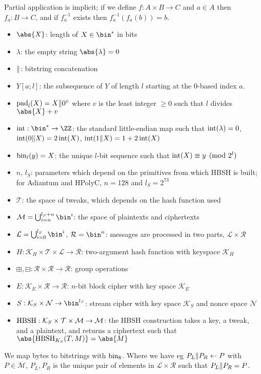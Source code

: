 \documentclass[eprint.tex]{subfiles}
\begin{document}
Partial application is implicit; if we define $f: A \times B \rightarrow C$ and
$a \in A$ then $f_a: B \rightarrow C$, and if $f_a^{-1}$ exists then $f_a^{-1}(f_a(b)) = b$.
\begin{itemize}
    \item $\abs{X}$: length of $X \in \bin^{*}$ in bits
    \item $\lambda$: the empty string $\abs{\lambda} = 0$
    \item $\Vert$: bitstring concatenation
    \item $Y[a;l]$: the subsequence of $Y$ of length $l$ starting at the 0-based index $a$.
    \item $\operatorname{pad}_l(X) = X \Vert 0^v$
    where $v$ is the least integer $\geq 0$ such that $l$ divides $\abs{X} + v$
    \item $\intify: \bin^{*} \rightarrow \ZZ$: the
    standard little-endian map such that
    $\operatorname{int}(\lambda) = 0$, $\operatorname{int}(0 \Vert X) = 2\operatorname{int}(X)$, $\operatorname{int}(1 \Vert X) = 1 + 2\operatorname{int}(X)$
    \item $\operatorname{bin}_l(y) = X$: the unique
    $l$-bit sequence such that $\operatorname{int}(X) \equiv y \pmod{2^l}$
    \item $n$, $l_S$: parameters which depend on the
    primitives from which HBSH is built;
    for Adiantum and HPolyC, $n = 128$ and $l_S = 2^{73}$
    \item $\mathcal{T}$: the
    space of tweaks, which depends on the hash function used
    \item $\mathcal{M} = \bigcup_{i=n}^{l_S + n}\bin^i$: the
    space of plaintexts and ciphertexts
    \item $\mathcal{L} = \bigcup_{i=0}^{l_S}\bin^i$, $\mathcal{R} = \bin^n$:
    messages are processed in two parts,
    $\mathcal{L} \times \mathcal{R}$
    \item $H: \mathcal{K}_H \times \mathcal{T} \times \mathcal{L} \rightarrow \mathcal{R}$:
    two-argument hash function with keyspace $\mathcal{K}_H$
    \item $\boxplus, \boxminus: \mathcal{R} \times \mathcal{R} \rightarrow \mathcal{R}$:
    group operations
    \item $E: \mathcal{K}_E \times \mathcal{R} \rightarrow \mathcal{R}$:
    $n$-bit block cipher with key space $\mathcal{K}_E$
    \item $S: \mathcal{K}_S \times \mathcal{N} \rightarrow \bin^{l_S}$:
    stream cipher with key space $\mathcal{K}_S$
    and nonce space $\mathcal{N}$
    \item $\operatorname{HBSH} : \mathcal{K}_S \times \mathcal{T} \times \mathcal{M} \rightarrow \mathcal{M}$:
    the HBSH construction takes a key, a tweak, and a plaintext,
    and returns a ciphertext
    such that $\abs{\HBSH_{K_S}(T, M)} = \abs{M}$
\end{itemize}
We map bytes to bitstrings with $\operatorname{bin}_8$.
Where we have eg $P_L \Vert P_R \gets P$
with $P \in \mathcal{M}$, $P_L, P_R$ is the unique
pair of elements in $\mathcal{L} \times \mathcal{R}$ such that
$P_L \Vert P_R = P$.
\end{document}
